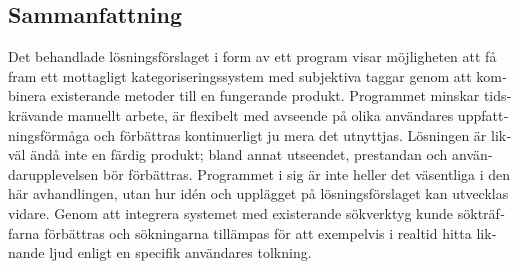 \begin{otherlanguage}{swedish}
    \newpage\subsection*{Sammanfattning}
    Det behandlade lösningsförslaget i form av ett program visar möjligheten att få fram ett mottagligt kategoriseringssystem med subjektiva taggar genom att kombinera existerande metoder till en fungerande produkt. Programmet minskar tidskrävande manuellt arbete, är flexibelt med avseende på olika användares uppfattningsförmåga och förbättras kontinuerligt ju mera det utnyttjas. Lösningen är likväl ändå inte en färdig produkt; bland annat utseendet, prestandan och användarupplevelsen bör förbättras. Programmet i sig är inte heller det väsentliga i den här avhandlingen, utan hur idén och upplägget på lösningsförslaget kan utvecklas vidare. Genom att integrera systemet med existerande sökverktyg kunde sökträffarna förbättras och sökningarna tillämpas för att exempelvis i realtid hitta liknande ljud enligt en specifik användares tolkning.

\end{otherlanguage}